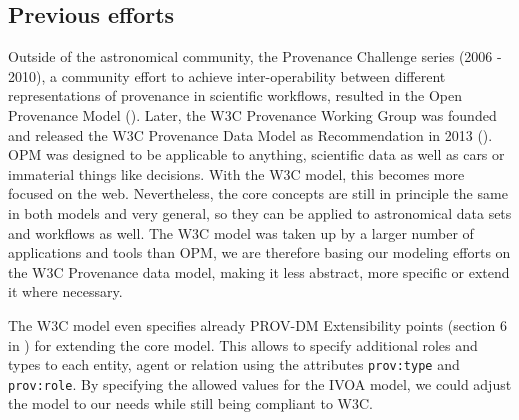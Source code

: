\subsection{Previous efforts}

Outside of the astronomical community, the Provenance Challenge series (2006 - 2010), a community effort to achieve inter-operability between different representations of provenance in scientific workflows, resulted in the Open Provenance Model (\cite{moreau2010}). 
Later, the W3C Provenance Working Group was founded and released the W3C Provenance Data Model as Recommendation in 2013 (\cite{std:W3CProvDM}). 
OPM was designed to be applicable to anything, scientific data as well as cars or immaterial things like decisions. With the W3C model, this becomes more focused on the web.  Nevertheless, the core concepts are still in principle the same in both models and very general, so they can be applied to astronomical data sets and workflows as well. 
The W3C model was taken up by a larger number of applications and tools than OPM, we are therefore basing our modeling efforts on the W3C Provenance data model, making it less abstract, more specific or extend it where necessary. 


The W3C model even specifies already PROV-DM Extensibility points (section 6 in \cite{std:W3CProvDM}) for extending the core model. This allows to specify additional roles and types to each entity, agent or relation using the attributes \texttt{prov:type} and \texttt{prov:role}.
By specifying the allowed values for the IVOA model, we could adjust the model to our needs while still being compliant to W3C.

